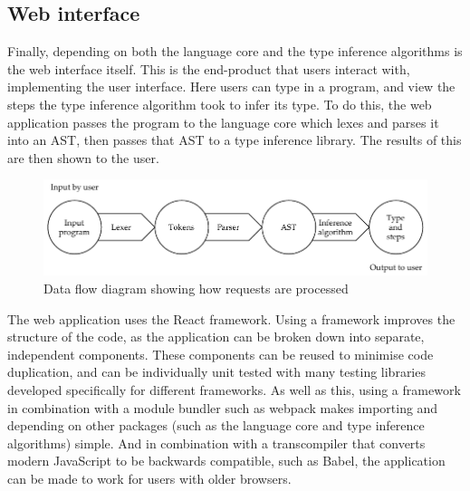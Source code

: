 \documentclass[a4paper,fleqn,oneside,12pt]{report}
\begin{document}
\subsection{Web interface}\label{id:h.q67ivlz7h61r}

Finally, depending on both the language core and the type inference algorithms is the web interface itself. This is the end-product that users interact with, implementing the user interface. Here users can type in a program, and view the steps the type inference algorithm took to infer its type. To do this, the web application passes the program to the language core which lexes and parses it into an AST, then passes that AST to a type inference library. The results of this are then shown to the user.

{\centering \begin{figure}[h!]
  \centering
  \includegraphics[width=\linewidth]{images/pipeline.pdf}
  \caption{Data flow diagram showing how requests are processed}
\end{figure} \par}
The web application uses the React framework. Using a framework improves the structure of the code, as the application can be broken down into separate, independent components. These components can be reused to minimise code duplication, and can be individually unit tested with many testing libraries developed specifically for different frameworks. As well as this, using a framework in combination with a module bundler such as webpack makes importing and depending on other packages (such as the language core and type inference algorithms) simple. And in combination with a transcompiler that converts modern JavaScript to be backwards compatible, such as Babel, the application can be made to work for users with older browsers.
\end{document}
